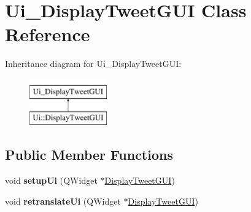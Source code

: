 \hypertarget{classUi__DisplayTweetGUI}{}\section{Ui\+\_\+\+Display\+Tweet\+G\+UI Class Reference}
\label{classUi__DisplayTweetGUI}
Inheritance diagram for Ui\+\_\+\+Display\+Tweet\+G\+UI\+:\begin{figure}[H]
\begin{center}
\leavevmode
\includegraphics[height=2.000000cm]{classUi__DisplayTweetGUI}
\end{center}
\end{figure}
\subsection*{Public Member Functions}
\begin{DoxyCompactItemize}
\item 
void {\bfseries setup\+Ui} (Q\+Widget $\ast$\hyperlink{classDisplayTweetGUI}{Display\+Tweet\+G\+UI})\hypertarget{classUi__DisplayTweetGUI_a0b26a35ccd511064099316041f8698bb}{}\label{classUi__DisplayTweetGUI_a0b26a35ccd511064099316041f8698bb}

\item 
void {\bfseries retranslate\+Ui} (Q\+Widget $\ast$\hyperlink{classDisplayTweetGUI}{Display\+Tweet\+G\+UI})\hypertarget{classUi__DisplayTweetGUI_aa601def432aa9780fedb1085898e1093}{}\label{classUi__DisplayTweetGUI_aa601def432aa9780fedb1085898e1093}

\end{DoxyCompactItemize}
